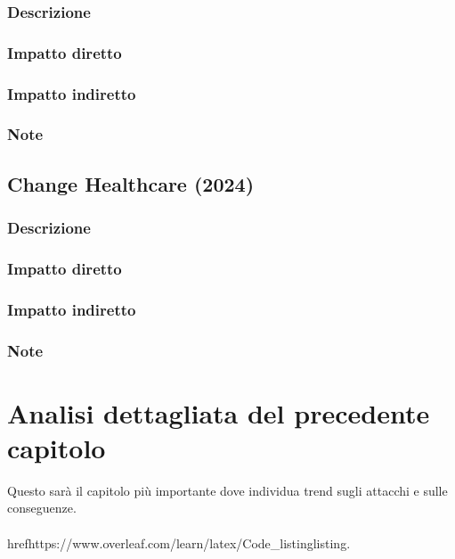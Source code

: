\documentclass[12pt,a4paper,openright,twoside]{report}
\begin{document}
\subsection{Descrizione}

\subsection{Impatto diretto}

\subsection{Impatto indiretto}

\subsection{Note}
\section{Change Healthcare (2024)}
\subsection{Descrizione}

\subsection{Impatto diretto}

\subsection{Impatto indiretto}

\subsection{Note}

\clearpage{\pagestyle{empty}\cleardoublepage}



\chapter{Analisi dettagliata del precedente capitolo}
Questo sar\`a il capitolo pi\`u importante dove individua trend sugli attacchi e sulle conseguenze.\\
\\href{https://www.overleaf.com/learn/latex/Code\_listing}{listing}.
\end{document}
